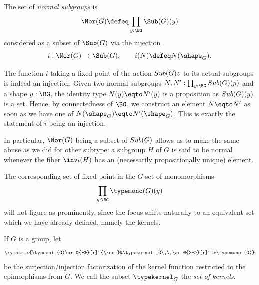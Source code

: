 \begin{definition}
  \label{def:normalsubgroup}
  The set of \emph{normal subgroups} is
  $$\Nor(G)\defeq\prod_{y:\BG}\Sub(G)(y)$$
  considered as a subset of $\Sub(G)$ via the injection
  $$i:\Nor(G)\to\Sub(G),\qquad i(N)\defeq N(\sh_G).$$
\end{definition}
\begin{remark}
  The function $i$ taking a fixed point of the action $\\Sub(G)z$ to its actual
  subgroups is indeed an injection.
  Given two normal subgroups %
  $N,N':\prod_{y:\BG} \\Sub(G)(y)$ and a shape $y:\BG$, the identity type $N(y) \eqto N'(y)$ is a
  proposition as $\\Sub(G)(y)$ is a set. Hence, by connectedness of $\BG$, we
  construct an element $N \eqto N'$ as soon as we have one of
  $N(\sh_G) \eqto  N'(\sh_G)$. This is exactly the statement of $i$ being an
  injection.

  In particular, $\Nor(G)$ being a subset of $\\Sub(G)$ allows us to make the same
  abuse as we did for other subtype: a subgroup $H$ of $G$ is said to be normal
  whenever the fiber $\inv i (H)$ has an (necessarily propositionally unique)
  element.
\end{remark}



  The corresponding set of fixed point in the $G$-set of monomorphisms
  $$\prod_{y:\BG}\typemono(G)(y)$$
will not figure as prominently, since the focus shifts naturally to an equivalent set which we have already defined, namely the kernels.
  \begin{definition}
    \label{def:setofkernels}
    If $G$ is a group, let
    $$\xymatrix{\typeepi(G)\ar@{->>}[r]^{\ker}&\typekernel_G\,\,\ar@{>->}[r]^i&\typemono(G)}$$
    be the surjection/injection factorization of the kernel function restricted to the epimorphisms from $G$.  We call the subset $\typekernel_G$ the \emph{set of kernels}.
  \end{definition}

